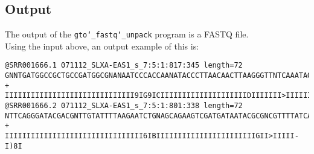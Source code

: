 \subsection*{Output}
The output of the \texttt{gto\char`_fastq\char`_unpack} program is a FASTQ file.\\
Using the input above, an output example of this is:
\begin{lstlisting}
@SRR001666.1 071112_SLXA-EAS1_s_7:5:1:817:345 length=72
GNNTGATGGCCGCTGCCGATGGCGNANAATCCCACCAANATACCCTTAACAACTTAAGGGTTNTCAAATAGA
+
IIIIIIIIIIIIIIIIIIIIIIIIIIIIII9IG9ICIIIIIIIIIIIIIIIIIIIIDIIIIIII>IIIIII/
@SRR001666.2 071112_SLXA-EAS1_s_7:5:1:801:338 length=72
NTTCAGGGATACGACGNTTGTATTTTAAGAATCTGNAGCAGAAGTCGATGATAATACGCGNCGTTTTATCAN
+
IIIIIIIIIIIIIIIIIIIIIIIIIIIIIIII6IBIIIIIIIIIIIIIIIIIIIIIIIGII>IIIII-I)8I
\end{lstlisting}
